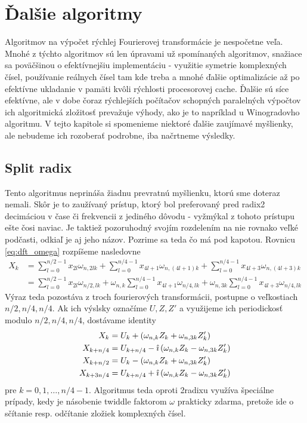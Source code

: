 \section{Ďalšie algoritmy}

Algoritmov na výpočet rýchlej Fourierovej transformácie je nespočetne
veľa. Mnohé z týchto algoritmov sú len úpravami už spomínaných
algoritmov, snažiace sa poväčšinou o efektívnejšiu implementáciu -
využitie symetrie komplexných čísel, používanie reálnych čísel tam kde
treba a mnohé ďalšie optimalizácie až po efektívne ukladanie v pamäti
kvôli rýchlosti procesorovej cache. Ďalšie sú síce efektívne, ale v
dobe čoraz rýchlejších počítačov schopných paralelných výpočtov ich
algoritmická zložitosť prevažuje výhody, ako je to napríklad u
Winogradovho algoritmu. V tejto kapitole si spomenieme
niektoré ďalšie zaujímavé myšlienky, ale nebudeme ich rozoberať
podrobne, iba načrtneme výsledky.

\subsection{Split radix}
Tento algoritmus neprináša žiadnu prevratnú myšlienku, ktorú sme
doteraz nemali. Skôr je to zaužívaný prístup, ktorý bol preferovaný
pred radix2 decimáciou v čase či frekvencii z jediného dôvodu -
vyžmýkal z tohoto prístupu ešte čosi naviac. Je taktiež pozoruhodný
svojím rozdelením na nie rovnako veľké podčasti, odkiaľ je aj jeho
názov. Pozrime sa teda čo má pod kapotou.
Rovnicu \ref{eq:dft_omega} rozpíšeme nasledovne
\begin{equation}
\begin{split}
    X_k &= \sum_{l=0}^{n/2-1} x_{2l} \omega_{n, 2lk} +
          \sum_{l=0}^{n/4-1} x_{4l+1} \omega_{n,(4l+1)k} +
          \sum_{l=0}^{n/4-1} x_{4l+3} \omega_{n,(4l+3)k} \\          
        &= \sum_{l=0}^{n/2-1} x_{2l} \omega_{n/2, lk} +
          \omega_{n,k}
            \sum_{l=0}^{n/4-1} x_{4l+1} \omega_{n/4, lk} +
          \omega_{n,3k}
          \sum_{l=0}^{n/4-1} x_{4l+3} \omega_{n/4,lk}
\end{split}
\end{equation}
Výraz teda pozostáva z troch fourierových transformácii, postupne o
veľkostiach $n/2,n/4,n/4$. Ak ich výslsky označíme
$U,Z,Z'$ a využijeme ich periodickosť modulo $n/2,n/4,n/4$,
dostávame identity
\begin{align}
    X_k  &= U_k + \left( \omega_{n,k} Z_k + 
                \omega_{n,3k} Z'_k \right) \\
    X_{k+n/4}  &= U_{k+n/4} - \hat{\imath} \left( \omega_{n,k} Z_k -
                \omega_{n,3k} Z'_k \right) \\
    X_{k+n/2}  &= U_{k} -  \left( \omega_{n,k} Z_k + 
                \omega_{n,3k} Z'_k \right) \\
    X_{k+3n/4}  &= U_{k+n/4} + \hat{\imath} \left( \omega_{n,k} Z_k -
                \omega_{n,3k} Z'_k \right) \\
\end{align}
pre $k=0,1,\dots,n/4-1$. Algoritmus teda oproti 2radixu využíva
špeciálne prípady, kedy je násobenie twiddle faktorom $\omega$
prakticky zdarma, pretože ide o sčítanie resp. odčítanie zložiek
komplexných čísel.

